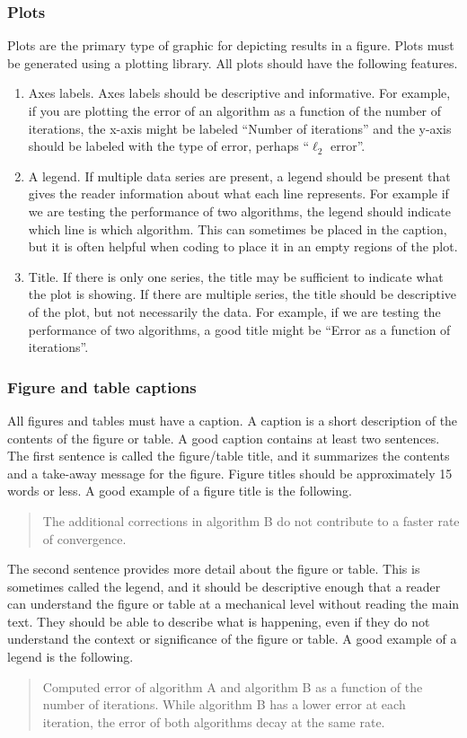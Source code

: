 \documentclass[]{article}
\begin{document}
\subsubsection{Plots}
Plots are the primary type of graphic for depicting results in a figure. Plots must be generated using a plotting library. All plots should have the following features.
\begin{enumerate}
    \item Axes labels. Axes labels should be descriptive and informative. For example, if you are plotting the error of an algorithm as a function of the number of iterations, the x-axis might be labeled ``Number of iterations'' and the y-axis should be labeled with the type of error, perhaps ``$\ell_2$ error''.
    \item A legend. If multiple data series are present, a legend should be present that gives the reader information about what each line represents. For example if we are testing the performance of two algorithms, the legend should indicate which line is which algorithm. This can sometimes be placed in the caption, but it is often helpful when coding to place it in an empty regions of the plot.
    \item Title. If there is only one series, the title may be sufficient to indicate what the plot is showing. If there are multiple series, the title should be descriptive of the plot, but not necessarily the data. For example, if we are testing the performance of two algorithms, a good title might be ``Error as a function of iterations''.
\end{enumerate}

\subsubsection{Figure and table captions}

All figures and tables must have a caption. A caption is a short description of the contents of the figure or table. A good caption contains at least two sentences. The first sentence is called the figure/table title, and it summarizes the contents and a take-away message for the figure. Figure titles should be approximately 15  words or less.
A good example of a figure title is the following.
\begin{quote}
    The additional corrections in algorithm B do not contribute to a faster rate of convergence.
\end{quote}

The second sentence provides more detail about the figure or table. This is sometimes called the legend, and it should be descriptive enough that a reader can understand the figure or table at a mechanical level without reading the main text. They should be able to describe what is happening, even if they do not understand the context or significance of the figure or table. A good example of a legend is the following.
\begin{quote}
    Computed error of algorithm A and algorithm B as a function of the number of iterations. While algorithm B has a lower error at each iteration, the error of both algorithms decay at the same rate.
\end{quote}
\end{document}

